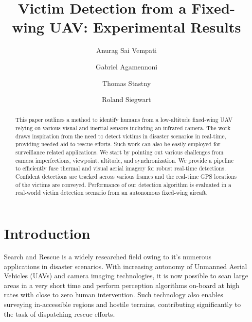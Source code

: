 \documentclass[runningheads]{llncs}
\begin{document}
\lstset{language=C++}  

\pagestyle{headings}

\mainmatter

\title{Victim Detection from a Fixed-wing UAV: Experimental Results}

\author{Anurag Sai Vempati \and Gabriel Agamennoni \and
Thomas Stastny \and Roland Siegwart}




\maketitle

\begin{abstract}
This paper outlines a method to identify humans from a low-altitude fixed-wing UAV relying on various visual and inertial sensors including an infrared camera. The work draws inspiration from the need to detect victims in disaster scenarios in real-time, providing needed aid to rescue efforts. Such work can also be easily employed for surveillance related applications. We start by pointing out various challenges from camera imperfections, viewpoint, altitude, and synchronization. We provide a pipeline to efficiently fuse thermal and visual aerial imagery for robust real-time detections. Confident detections are tracked across various frames and the real-time GPS locations of the victims are conveyed. Performance of our detection algorithm is evaluated in a real-world victim detection scenario from an autonomous fixed-wing aircaft.
\end{abstract}


\section{Introduction}
Search and Rescue is a widely researched field owing to it's numerous applications in disaster scenarios. With increasing autonomy of Unmanned Aerial Vehicles (UAVs) and camera imaging technologies, it is now possible to scan large areas in a very short time and perform perception algorithms on-board at high rates with close to zero human intervention. Such technology also enables surveying in-accessible regions and hostile terrains, contributing significantly to the task of dispatching rescue efforts.
\end{document}

